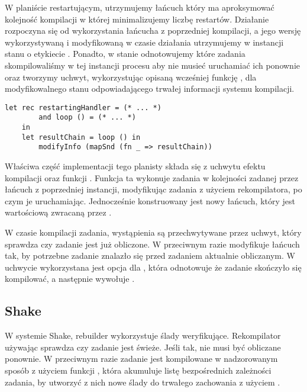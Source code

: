 

W planiście restartującym, utrzymujemy łańcuch który ma aproksymować kolejność kompilacji w której minimalizujemy liczbę restartów. Działanie rozpoczyna się od wykorzystania łańcucha z poprzedniej kompilacji, a jego wersję wykorzystywaną i modyfikowaną w czasie działania utrzymujemy w instancji stanu o etykiecie . Ponadto, w stanie  odnotowujemy które zadania skompilowaliśmy w tej instancji procesu aby nie musieć uruchamiać ich ponownie oraz tworzymy uchwyt, wykorzystując opisaną wcześniej funkcję , dla modyfikowalnego stanu odpowiadającego trwałej informacji systemu kompilacji.


\vspace{-1.25em}
\begin{lstlisting}[style=Haleff-long]
    let rec restartingHandler = (* ... *)
        and loop () = (* ... *)
    in
    let resultChain = loop () in
        modifyInfo (mapSnd (fn _ => resultChain))
\end{lstlisting}

Właściwa część implementacji tego planisty składa się z uchwytu efektu kompilacji  oraz funkcji . Funkcja ta wykonuje zadania w kolejności zadanej przez łańcuch z poprzedniej instancji, modyfikując zadania z użyciem rekompilatora, po czym je uruchamiając. Jednocześnie konstruowany jest nowy łańcuch, który jest wartościową zwracaną przez .



W czasie kompilacji zadania, wystąpienia  są przechwytywane przez uchwyt, który sprawdza czy zadanie jest już obliczone. W przeciwnym razie modyfikuje łańcuch tak, by potrzebne zadanie znalazło się przed zadaniem aktualnie obliczanym. W uchwycie wykorzystana jest opcja dla , która odnotowuje że zadanie skończyło się kompilować, a następnie wywołuje .

\subsection{Shake}



W systemie Shake, rebuilder wykorzystuje ślady weryfikujące. Rekompilator używając  sprawdza czy zadanie jest świeże. Jeśli tak, nie musi być obliczane ponownie. W przeciwnym razie zadanie jest kompilowane w nadzorowanym sposób z użyciem funkcji , która akumuluje listę bezpośrednich zależności zadania, by utworzyć z nich nowe ślady do trwałego zachowania z użyciem .

